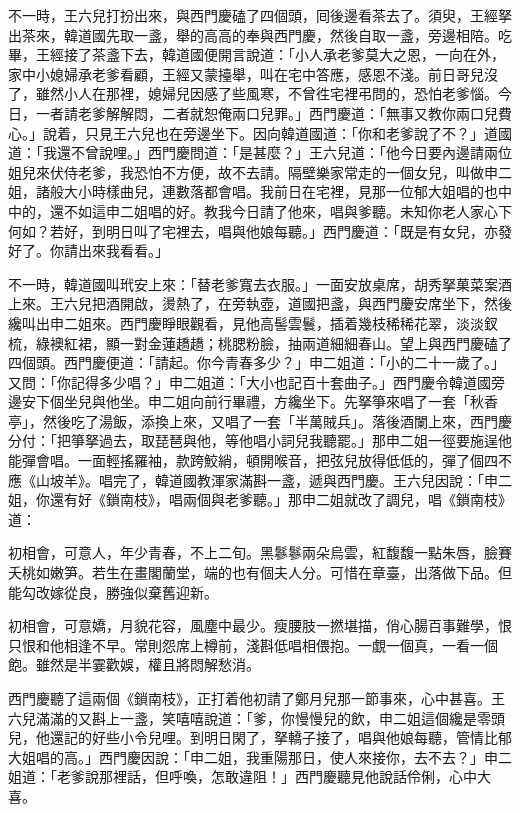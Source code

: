 不一時，王六兒打扮出來，與西門慶磕了四個頭，囘後邊看茶去了。須臾，王經拏出茶來，韓道國先取一盞，舉的高高的奉與西門慶，然後自取一盞，旁邊相陪。吃畢，王經接了茶盞下去，韓道國便開言說道：「小人承老爹莫大之恩，一向在外，家中小媳婦承老爹看顧，{}王經又蒙擡舉，叫在宅中答應，感恩不淺。前日哥兒沒了，雖然小人在那裡，媳婦兒因感了些風寒，不曾徃宅裡弔問的，恐怕老爹惱。今日，一者請老爹解解悶，二者就恕俺兩口兒罪。」西門慶道：「無事又教你兩口兒費心。」說着，只見王六兒也在旁邊坐下。因向韓道國道：「你和老爹說了不？」道國道：「我還不曾說哩。」西門慶問道：「是甚麼？」王六兒道：「他今日要內邊請兩位姐兒來伏侍老爹，我恐怕不方便，故不去請。隔壁樂家常走的一個女兒，叫做申二姐，諸般大小時樣曲兒，連數落都會唱。我前日在宅裡，見那一位郁大姐唱的也中中的，還不如這申二姐唱的好。教我今日請了他來，唱與爹聽。未知你老人家心下何如？若好，到明日叫了宅裡去，唱與他娘每聽。」西門慶道：「既是有女兒，亦發好了。你請出來我看看。」

不一時，韓道國叫玳安上來：「替老爹寬去衣服。」一面安放桌席，胡秀拏菓菜案酒上來。王六兒把酒開啟，燙熱了，在旁執壺，道國把盞，與西門慶安席坐下，然後纔叫出申二姐來。西門慶睜眼觀看，見他高髻雲鬟，插着幾枝稀稀花翠，淡淡釵梳，綠襖紅裙，顯一對金蓮趫趫；桃腮粉臉，抽兩道細細春山。{}望上與西門慶磕了四個頭。西門慶便道：「請起。你今青春多少？」申二姐道：「小的二十一歲了。」又問：「你記得多少唱？」申二姐道：「大小也記百十套曲子。」西門慶令韓道國旁邊安下個坐兒與他坐。申二姐向前行畢禮，方纔坐下。先拏箏來唱了一套「秋香亭」，然後吃了湯飯，添換上來，又唱了一套「半萬賊兵」。落後酒闌上來，西門慶分付：「把箏拏過去，取琵琶與他，等他唱小詞兒我聽罷。」那申二姐一徑要施逞他能彈會唱。一面輕搖羅袖，款跨鮫綃，頓開喉音，把弦兒放得低低的，彈了個四不應《山坡羊》。唱完了，韓道國教渾家滿斟一盞，遞與西門慶。王六兒因說：「申二姐，你還有好《鎖南枝》，唱兩個與老爹聽。」那申二姐就改了調兒，唱《鎖南枝》道：

\begin{myquote}
初相會，可意人，年少青春，不上二旬。黑鬖鬖兩朵烏雲，紅馥馥一點朱唇，臉賽夭桃如嫩笋。若生在畫閣蘭堂，端的也有個夫人分。可惜在章臺，出落做下品。但能勾改嫁從良，勝強似棄舊迎新。

初相會，可意嬌，月貌花容，風塵中最少。瘦腰肢一撚堪描，俏心腸百事難學，恨只恨和他相逢不早。常則怨席上樽前，淺斟低唱相偎抱。一覷一個真，一看一個飽。雖然是半霎歡娛，權且將悶解愁消。
\end{myquote}

西門慶聽了這兩個《鎖南枝》，正打着他初請了鄭月兒那一節事來，心中甚喜。王六兒滿滿的又斟上一盞，笑嘻嘻說道：「爹，你慢慢兒的飲，申二姐這個纔是零頭兒，{}他還記的好些小令兒哩。到明日閑了，拏轎子接了，唱與他娘每聽，管情比郁大姐唱的高。」西門慶因說：「申二姐，我重陽那日，使人來接你，去不去？」申二姐道：「老爹說那裡話，但呼喚，怎敢違阻！」西門慶聽見他說話伶俐，心中大喜。

